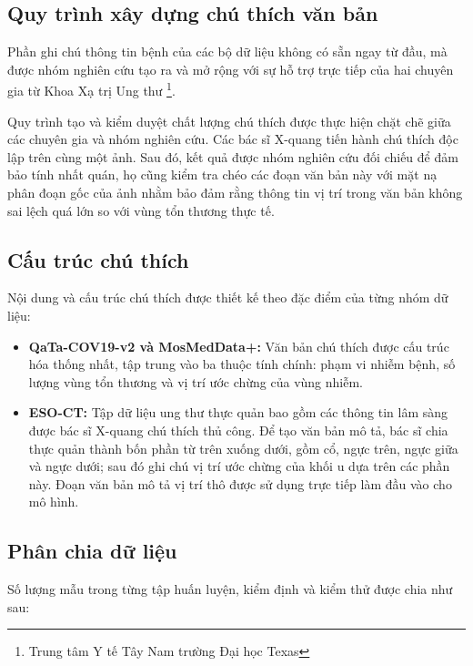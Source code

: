 \subsection{Quy trình xây dựng chú thích văn bản}

Phần ghi chú thông tin bệnh của các bộ dữ liệu không có sẵn ngay từ đầu, mà được nhóm nghiên cứu tạo ra và mở rộng với sự hỗ trợ trực tiếp của hai chuyên gia từ Khoa Xạ trị Ung thư \footnote{Trung tâm Y tế Tây Nam trường Đại học Texas}.

Quy trình tạo và kiểm duyệt chất lượng chú thích được thực hiện chặt chẽ giữa các chuyên gia và nhóm nghiên cứu. Các bác sĩ X-quang tiến hành chú thích độc lập trên cùng một ảnh. Sau đó, kết quả được nhóm nghiên cứu đối chiếu để đảm bảo tính nhất quán, họ cũng kiểm tra chéo các đoạn văn bản này với mặt nạ phân đoạn gốc của ảnh nhằm bảo đảm rằng thông tin vị trí trong văn bản không sai lệch quá lớn so với vùng tổn thương thực tế.

\subsection{Cấu trúc chú thích}

Nội dung và cấu trúc chú thích được thiết kế theo đặc điểm của từng nhóm dữ liệu:

\begin{itemize}
    \item \textbf{QaTa-COV19-v2 và MosMedData+:} Văn bản chú thích được cấu trúc hóa thống nhất, tập trung vào ba thuộc tính chính: phạm vi nhiễm bệnh, số lượng vùng tổn thương và vị trí ước chừng của vùng nhiễm.

    \item \textbf{ESO-CT:} Tập dữ liệu ung thư thực quản bao gồm các thông tin lâm sàng được bác sĩ X-quang chú thích thủ công. Để tạo văn bản mô tả, bác sĩ chia thực quản thành bốn phần từ trên xuống dưới, gồm cổ, ngực trên, ngực giữa và ngực dưới; sau đó ghi chú vị trí ước chừng của khối u dựa trên các phần này. Đoạn văn bản mô tả vị trí thô được sử dụng trực tiếp làm đầu vào cho mô hình.
\end{itemize}

\subsection{Phân chia dữ liệu}

Số lượng mẫu trong từng tập huấn luyện, kiểm định và kiểm thử được chia như sau:

